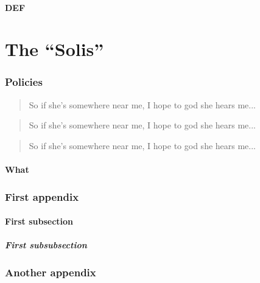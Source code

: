 \documentclass{solis}
\begin{document}
\subsection{DEF}
\label{subsec:Def}
\lipsum[9-12]
\parencite{levine2014}
\begin{widetext}
    \lipsum[21]
\end{widetext}

\part{The ``Solis''}
\section{Policies}
\label{sec:Policies}
\lipsum[13]
\begin{beware}[Of This]
    \lipsum[25]
\end{beware}

\begin{verse}
    So if she’s somewhere
near me, I hope to god she
hears me...
\end{verse}
\begin{quotation}
    So if she’s somewhere
near me, I hope to god she
hears me...
\end{quotation}
\begin{quote}
    So if she’s somewhere
near me, I hope to god she
hears me...
\end{quote}
\subsection{What}
\lipsum[30-32]

\backmatter
\makebib

\begin{appendices}
    \section{First appendix}
    \lipsum[11-12]
    \subsection{First subsection}
    \subsubsection{First subsubsection}
    \lipsum[23]
    
    \section{Another appendix}
    \lipsum[24]
\end{appendices}

\end{document}
